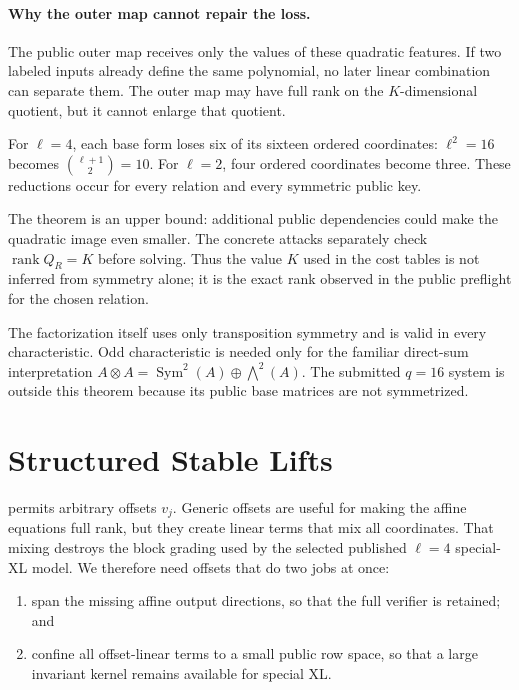 \documentclass[11pt]{article}
\newcommand{\Sym}{\operatorname{Sym}}
\newcommand{\rank}{\operatorname{rank}}
\begin{document}
\paragraph{Why the outer map cannot repair the loss.}
The public outer map receives only the values of these quadratic features.  If
two labeled inputs already define the same polynomial, no later linear
combination can separate them.  The outer map may have full rank on the
$K$-dimensional quotient, but it cannot enlarge that quotient.

For $\ell=4$, each base form loses six of its sixteen ordered coordinates:
$\ell^2=16$ becomes $\binom{\ell+1}{2}=10$.  For $\ell=2$, four ordered
coordinates become three.  These reductions occur for every relation and every
symmetric public key.

The theorem is an upper bound: additional public dependencies could make the
quadratic image even smaller.  The concrete attacks separately check
$\rank Q_R=K$ before solving.  Thus the value $K$ used in the cost tables is
not inferred from symmetry alone; it is the exact rank observed in the public
preflight for the chosen relation.

The factorization itself uses only transposition symmetry and is valid in every
characteristic.  Odd characteristic is needed only for the familiar direct-sum
interpretation
$A\otimes A=\Sym^2(A)\oplus\bigwedge^2(A)$.  The submitted $q=16$ system is
outside this theorem because its public base matrices are not symmetrized.

\section{Structured Stable Lifts}\label{sec:structured-lift}

 permits arbitrary offsets $v_j$.  Generic offsets
are useful for making the affine equations full rank, but they create linear
terms that mix all coordinates.  That mixing destroys the block grading used
by the selected published $\ell=4$ special-XL model.  We therefore need offsets
that do two jobs at once:
\begin{enumerate}[label=(\roman*),itemsep=2pt]
\item span the missing affine output directions, so that the full verifier is
      retained; and
\item confine all offset-linear terms to a small public row space, so that a
      large invariant kernel remains available for special XL.\@
\end{enumerate}
\end{document}
